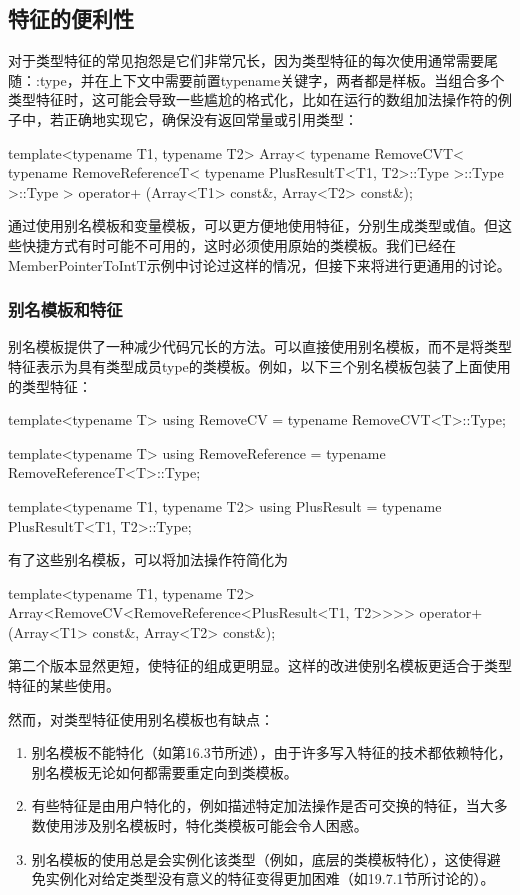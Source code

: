 \subsection{特征的便利性}

对于类型特征的常见抱怨是它们非常冗长，因为类型特征的每次使用通常需要尾随：:type，并在上下文中需要前置typename关键字，两者都是样板。当组合多个类型特征时，这可能会导致一些尴尬的格式化，比如在运行的数组加法操作符的例子中，若正确地实现它，确保没有返回常量或引用类型：

\begin{cpp}
template<typename T1, typename T2>
Array<
	typename RemoveCVT<
		typename RemoveReferenceT<
			typename PlusResultT<T1, T2>::Type
		>::Type
	>::Type
>
operator+ (Array<T1> const&, Array<T2> const&);
\end{cpp}

通过使用别名模板和变量模板，可以更方便地使用特征，分别生成类型或值。但这些快捷方式有时可能不可用的，这时必须使用原始的类模板。我们已经在MemberPointerToIntT示例中讨论过这样的情况，但接下来将进行更通用的讨论。

\subsubsection{别名模板和特征}

别名模板提供了一种减少代码冗长的方法。可以直接使用别名模板，而不是将类型特征表示为具有类型成员type的类模板。例如，以下三个别名模板包装了上面使用的类型特征：

\begin{cpp}
template<typename T>
using RemoveCV = typename RemoveCVT<T>::Type;

template<typename T>
using RemoveReference = typename RemoveReferenceT<T>::Type;

template<typename T1, typename T2>
using PlusResult = typename PlusResultT<T1, T2>::Type;
\end{cpp}

有了这些别名模板，可以将加法操作符简化为

\begin{cpp}
template<typename T1, typename T2>
Array<RemoveCV<RemoveReference<PlusResult<T1, T2>>>>
operator+ (Array<T1> const&, Array<T2> const&);
\end{cpp}

第二个版本显然更短，使特征的组成更明显。这样的改进使别名模板更适合于类型特征的某些使用。

然而，对类型特征使用别名模板也有缺点：

\begin{enumerate}
\item
别名模板不能特化（如第16.3节所述），由于许多写入特征的技术都依赖特化，别名模板无论如何都需要重定向到类模板。

\item 
有些特征是由用户特化的，例如描述特定加法操作是否可交换的特征，当大多数使用涉及别名模板时，特化类模板可能会令人困惑。

\item
别名模板的使用总是会实例化该类型（例如，底层的类模板特化），这使得避免实例化对给定类型没有意义的特征变得更加困难（如19.7.1节所讨论的）。
\end{enumerate}

